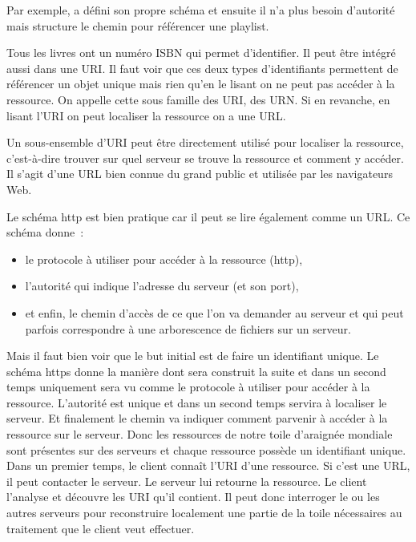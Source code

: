    Par exemple,  a défini son propre schéma et ensuite il n'a plus besoin d'autorité mais structure le chemin pour référencer une playlist. 
   
   
   
   Tous les livres ont un numéro \ac{ISBN} qui permet d'identifier. Il peut être intégré aussi dans une URI. Il faut voir que ces deux types d'identifiants permettent de référencer un objet unique mais rien qu'en le lisant on ne peut pas accéder à la ressource. On appelle cette sous famille des \ac{URI}, des \ac{URN}. Si en revanche, en lisant l'URI on peut localiser la ressource on a une \ac{URL}.

Un sous-ensemble d’\ac{URI} peut être directement utilisé pour localiser la ressource, c’est-à-dire trouver sur quel serveur se trouve la ressource et comment y accéder. Il s’agit d’une URL bien connue du grand public et utilisée par les navigateurs Web.

Le schéma http est bien pratique car il peut se lire également comme un \ac{URL}. Ce schéma donne~:

\begin{itemize}
\item le protocole à utiliser pour accéder à la ressource (http),
\item l’autorité qui indique l’adresse du serveur (et son port),
\item et enfin, le chemin d’accès de ce que l'on va demander au serveur et qui peut parfois correspondre à une arborescence de fichiers sur un serveur.
\end{itemize}
   
   
       \vspace{1em}

  Mais il faut bien voir que le but initial est de faire un identifiant unique. Le schéma https donne la manière dont sera construit la suite et dans un second temps uniquement sera vu comme le protocole à utiliser pour accéder à la ressource. L'autorité est unique et dans un second temps servira à localiser le serveur. Et finalement le chemin va indiquer comment parvenir à accéder à la ressource sur le serveur. Donc les ressources de notre toile d'araignée mondiale sont présentes sur des serveurs et chaque ressource possède un identifiant unique. Dans un premier temps, le client connaît l'\ac{URI} d'une ressource. Si c'est une \ac{URL}, il peut contacter le serveur. Le serveur lui retourne la ressource. Le client l'analyse et découvre les \ac{URI} qu'il contient. Il peut donc interroger le ou les autres serveurs pour reconstruire localement une partie de la toile nécessaires au traitement que le client veut effectuer.
  
